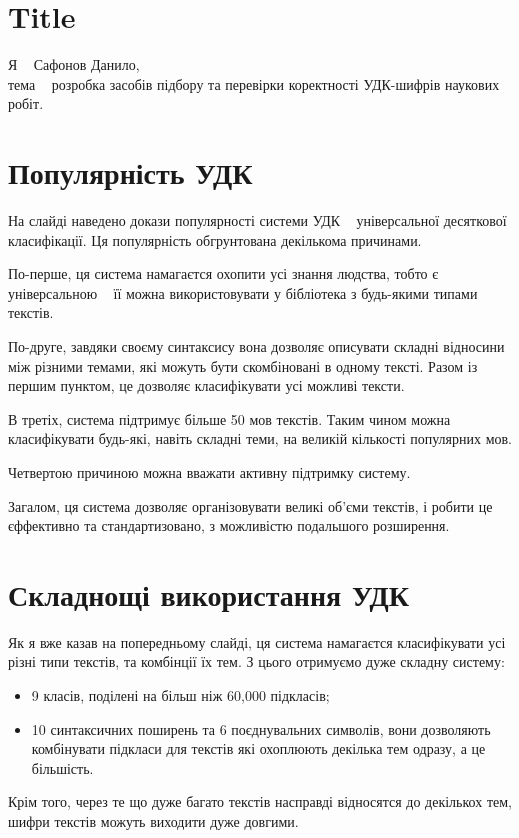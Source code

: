 \documentclass{article}
\let\oldsection\section
\renewcommand{\section}{\clearpage\oldsection}
\begin{document}
\section{Title}
Я \textemdash~ Сафонов Данило,\\
тема \textemdash~
розробка засобів підбору та перевірки коректності УДК-шифрів наукових робіт.

\section{Популярність УДК}
На слайді наведено докази популярності системи УДК \textemdash~
універсальної десяткової класифікації.
Ця популярність обгрунтована декількома причинами.

По-перше, ця система намагаєтся охопити усі знання людства, тобто є універсальною
\textemdash~ її можна використовувати у бібліотека з будь-якими типами текстів.

По-друге, завдяки своєму синтаксису вона дозволяє описувати складні відносини
між різними темами, які можуть бути скомбіновані в одному тексті.
Разом із першим пунктом, це дозволяє класифікувати усі можливі тексти.

В третіх, система підтримує більше 50 мов текстів.
Таким чином можна класифікувати будь-які, навіть складні теми,
на великій кількості популярних мов.

Четвертою причиною можна вважати активну підтримку систему.

Загалом, ця система дозволяє організовувати великі об'єми текстів,
і робити це єффективно та стандартизовано, з можливістю подальшого розширення.

\section{Складнощі використання УДК}
Як я вже казав на попередньому слайді, ця система намагаєтся класифікувати
усі різні типи текстів, та комбінції їх тем.
З цього отримуємо дуже складну систему:
\begin{itemize}
  \item 9 класів, поділені на більш ніж 60,000 підкласів;
  \item 10 синтаксичних поширень та 6 поєднувальних символів,
	  вони дозволяють комбінувати підкласи для текстів які охоплюють декілька тем одразу,
		а це більшість.
\end{itemize}

Крім того, через те що дуже багато текстів насправді відносятся до декількох тем,
шифри текстів можуть виходити дуже довгими.
\end{document}

